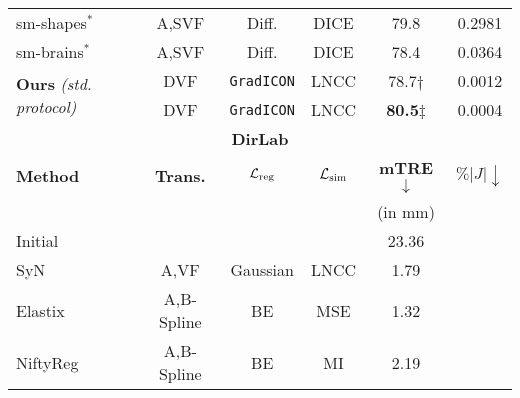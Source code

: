 \begin{table}[htp]
\begin{small}
{\begin{tabular}{lccccc}
				sm-shapes$^\ast$~\cite{hoffmann2022synthmorph}            & A,SVF                & Diff.                                 & DICE    & 79.8\resTS                  & 0.2981                  \\
				sm-brains$^\ast$~\cite{hoffmann2022synthmorph}            & A,SVF                & Diff.                                 & DICE    & 78.4\resTS                 & 0.0364                  \\
				\multirow{2}{*}{\textbf{Ours} \emph{(std. protocol)}}     & DVF                  & \cellcolor{black!10}\texttt{GradICON} & LNCC    & 78.7$\dagger$               & 0.0012                  \\
				                                                          & DVF                  & \cellcolor{black!10}\texttt{GradICON} & LNCC    & \bf{80.5}$\ddagger$         & 0.0004                  \\
				\midrule
				\multicolumn{6}{c}{\cellcolor{blue!10}\bf DirLab}                                                                                                                                          \\ \midrule
				\bf Method                                                & \bf Trans.           & $\mathcal{L}_{\text{reg}}$                               & $\mathcal{L}_{\text{sim}}$ & \textbf{mTRE} $\downarrow$  & $\%|J|\downarrow$       \\[-2pt]
				                                                          &                      &                                       &         & {\footnotesize (in mm)}     &                         \\[-2pt]
				Initial                                                   &                      &                                       &         & 23.36\resTS                 &                         \\ \midrule
				SyN~\cite{avants2008symmetric}                            & A,VF                 & Gaussian                              & LNCC    & 1.79\resTS                  & \textemdash             \\
				Elastix~\cite{klein2009elastix}                           & A,B-Spline           & BE                                    & MSE     & 1.32\resTS                  & \textemdash             \\
				NiftyReg~\cite{modat2010fast}                             & A,B-Spline           & BE                                    & MI      & 2.19\resTS                  & \textemdash             \\

\end{tabular}}
\end{small}
\end{table}
